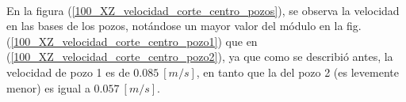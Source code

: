 \documentclass[10pt,a4paper,final]{article}
\begin{document}
%
\\
En la figura (\ref{100_XZ_velocidad_corte_centro_pozos}), se observa la velocidad en las bases de los pozos, notándose un mayor valor del módulo en la fig. (\ref{100_XZ_velocidad_corte_centro_pozo1}) que en (\ref{100_XZ_velocidad_corte_centro_pozo2}), ya que como se describió antes, la velocidad de pozo 1 es de $0.085~[m/s]$, en tanto que la del pozo 2 (es levemente menor) es igual a $0.057~[m/s]$.
%
\begin{figure}[tbhp]
   \centering
   \hspace{0.1\linewidth}

\end{figure}
\end{document}
